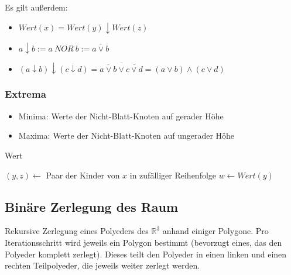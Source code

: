 Es gilt außerdem:
\begin{itemize}
	\item \(Wert(x) = Wert(y) \downarrow Wert(z)\)
	\item \(a \downarrow b := a~NOR~b := \overline{a \vee b}\)
	\item \((a \downarrow b) \downarrow (c \downarrow d) = \overline{\overline{a \vee b} \vee \overline{c \vee d}} = (a \vee b) \wedge (c \vee d)\)
\end{itemize}

\subsubsection{Extrema}
\begin{itemize}
	\item Minima: Werte der Nicht-Blatt-Knoten auf gerader Höhe
	\item Maxima: Werte der Nicht-Blatt-Knoten auf ungerader Höhe
\end{itemize}

\begin{algorithm}[H]
	\caption{Wert}

	\BlankLine
	
	$(y,z) \longleftarrow $ Paar der Kinder von $x$ in zufälliger Reihenfolge\newline
	$w \longleftarrow Wert(y)$
	\BlankLine

\end{algorithm}


\subsection{Binäre Zerlegung des Raum}
Rekursive Zerlegung eines Polyeders des \(\mathbb{R}^3\) anhand einiger Polygone. Pro Iterationsschritt wird jeweils ein Polygon bestimmt (bevorzugt eines, das den Polyeder komplett zerlegt). Dieses teilt den Polyeder in einen linken und einen rechten Teilpolyeder, die jeweils weiter zerlegt werden.

